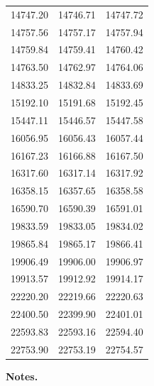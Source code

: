 \documentclass{article}
\begin{document}
\begin{table}[h!]
\begin{minipage}[t]{.4\linewidth}
\begin{center}
\begin{tabular}{ccc}
        14747.20 & 14746.71 & 14747.72 \\
        14757.56 & 14757.17 & 14757.94 \\
        14759.84 & 14759.41 & 14760.42 \\
        14763.50 & 14762.97 & 14764.06 \\
        14833.25 & 14832.84 & 14833.69 \\
        15192.10 & 15191.68 & 15192.45 \\
        15447.11 & 15446.57 & 15447.58 \\
        16056.95 & 16056.43 & 16057.44 \\
        16167.23 & 16166.88 & 16167.50 \\
        16317.60 & 16317.14 & 16317.92 \\
        16358.15 & 16357.65 & 16358.58 \\
        16590.70 & 16590.39 & 16591.01 \\
        19833.59 & 19833.05 & 19834.02 \\
        19865.84 & 19865.17 & 19866.41 \\
        19906.49 & 19906.00 & 19906.97 \\
        19913.57 & 19912.92 & 19914.17 \\
        22220.20 & 22219.66 & 22220.63 \\
        22400.50 & 22399.90 & 22401.01 \\
        22593.83 & 22593.16 & 22594.40 \\
        22753.90 & 22753.19 & 22754.57 \\
        \hline
        \end{tabular}
      \end{center}
    \end{minipage}
    \vspace{0.3cm}
    
    \textbf{Notes.}
    \end{table}
\end{document}
